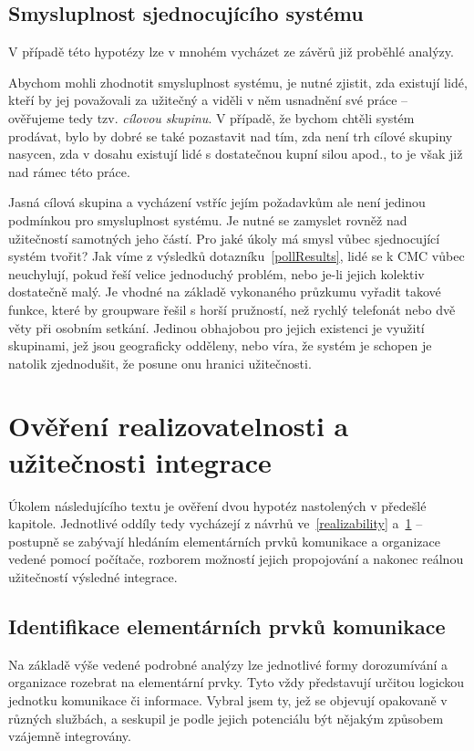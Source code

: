 \documentclass[12pt,oneside,final]{fithesis2}
\begin{document}
\section{Smysluplnost sjednocujícího systému}\label{meaningfulness}
V případě této hypotézy lze v mnohém vycházet ze závěrů již proběhlé analýzy.

Abychom mohli zhodnotit smysluplnost systému, je nutné zjistit, zda existují lidé, kteří by jej považovali za užitečný a viděli v něm usnadnění své práce -- ověřujeme tedy tzv. \emph{cílovou skupinu}. V případě, že bychom chtěli systém prodávat, bylo by dobré se také pozastavit nad tím, zda není trh cílové skupiny nasycen, zda v dosahu existují lidé s dostatečnou kupní silou apod., to je však již nad rámec této práce.

Jasná cílová skupina a vycházení vstříc jejím požadavkům ale není jedinou podmínkou pro smysluplnost systému. Je nutné se zamyslet rovněž nad užitečností samotných jeho částí. Pro jaké úkoly má smysl vůbec sjednocující systém tvořit? Jak víme z výsledků dotazníku~\ref{pollResults}, lidé se k CMC vůbec neuchylují, pokud řeší velice jednoduchý problém, nebo je-li jejich kolektiv dostatečně malý. Je vhodné na základě vykonaného průzkumu vyřadit takové funkce, které by groupware řešil s horší pružností, než rychlý telefonát nebo dvě věty při osobním setkání. Jedinou obhajobou pro jejich existenci je využití skupinami, jež jsou geograficky odděleny, nebo víra, že systém je schopen je natolik zjednodušit, že posune onu hranici užitečnosti.



\chapter{Ověření realizovatelnosti a užitečnosti integrace}
Úkolem následujícího textu je ověření dvou hypotéz nastolených v předešlé kapitole. Jednotlivé oddíly tedy vycházejí z návrhů ve~\ref{realizability} a~\ref{meaningfulness} -- postupně se zabývají hledáním elementárních prvků komunikace a organizace vedené pomocí počítače, rozborem možností jejich propojování a nakonec reálnou užitečností výsledné integrace.


\section{Identifikace elementárních prvků komunikace}\label{communicationElements}
Na základě výše vedené podrobné analýzy lze jednotlivé formy dorozumívání a organizace rozebrat na elementární prvky. Tyto vždy představují určitou logickou jednotku komunikace či informace. Vybral jsem ty, jež se objevují opakovaně v různých službách, a seskupil je podle jejich potenciálu být nějakým způsobem vzájemně integrovány.
\end{document}
